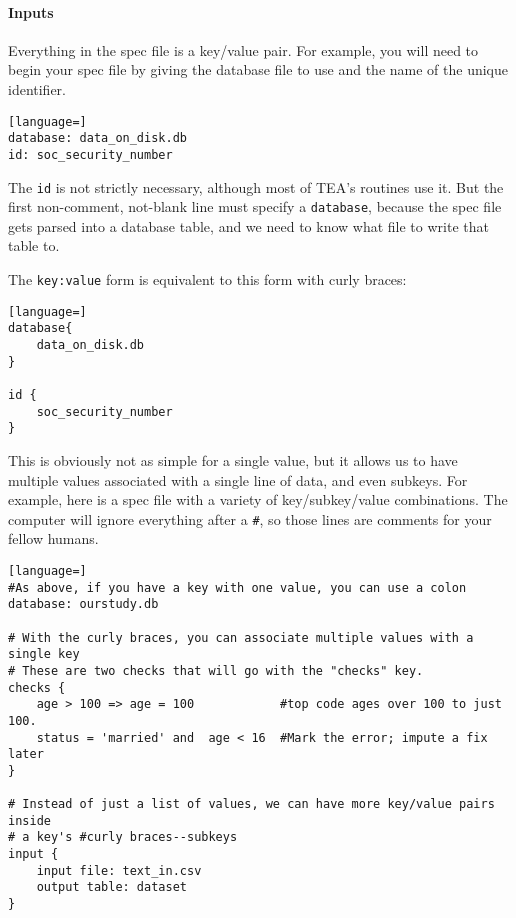 \documentclass{article}
\begin{document}
\paragraph{Inputs} 
Everything in the spec file is a key/value pair. For example, you will need to begin
your spec file by giving the database file to use and the name of the unique identifier.

\begin{lstlisting}[language=]
database: data_on_disk.db
id: soc_security_number
\end{lstlisting}

The {\tt id} is not strictly necessary, although most of TEA's routines use it. But the
first non-comment, not-blank line must specify a {\tt database}, because the spec file
gets parsed into a database table, and we need to know what file to write that table to.

The {\tt key:value} form is equivalent to this form with curly braces:

\begin{lstlisting}[language=]
database{ 
    data_on_disk.db
}

id { 
    soc_security_number
}
\end{lstlisting}

This is obviously not as simple for a single value, but it allows us to have multiple
values associated with a single line of data, and even subkeys. For example, here is
a spec file with a variety of key/subkey/value combinations. The computer will ignore
everything after a {\tt \#}, so those lines are comments for your fellow humans.

\begin{lstlisting}[language=]
#As above, if you have a key with one value, you can use a colon
database: ourstudy.db

# With the curly braces, you can associate multiple values with a single key
# These are two checks that will go with the "checks" key.
checks {
    age > 100 => age = 100            #top code ages over 100 to just 100.
    status = 'married' and  age < 16  #Mark the error; impute a fix later
}

# Instead of just a list of values, we can have more key/value pairs inside 
# a key's #curly braces--subkeys
input { 
    input file: text_in.csv
    output table: dataset
}

\end{lstlisting}
\end{document}
